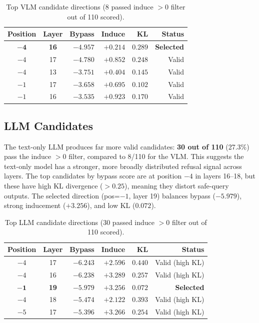 \documentclass[11pt,a4paper]{article}
\begin{document}
\begin{table}[H]\centering
\caption{Top VLM candidate directions (8 passed induce $> 0$ filter out of 110 scored).}
\begin{tabular}{ccrrrr}
\toprule
\textbf{Position} & \textbf{Layer} & \textbf{Bypass} & \textbf{Induce} & \textbf{KL} & \textbf{Status} \\
\midrule
$\mathbf{-4}$ & \textbf{16} & $\mathbf{-4.957}$ & $\mathbf{+0.214}$ & $\mathbf{0.289}$ & \textbf{Selected} \\
$-4$ & 17 & $-4.780$ & $+0.852$ & $0.248$ & Valid \\
$-4$ & 13 & $-3.751$ & $+0.404$ & $0.145$ & Valid \\
$-1$ & 17 & $-3.658$ & $+0.695$ & $0.102$ & Valid \\
$-1$ & 16 & $-3.535$ & $+0.923$ & $0.170$ & Valid \\
\bottomrule
\end{tabular}
\end{table}

\subsection{LLM Candidates}

The text-only LLM produces far more valid candidates: \textbf{30 out of 110} (27.3\%) pass the induce $> 0$ filter, compared to 8/110 for the VLM. This suggests the text-only model has a stronger, more broadly distributed refusal signal across layers. The top candidates by bypass score are at position $-4$ in layers 16--18, but these have high KL divergence ($> 0.25$), meaning they distort safe-query outputs. The selected direction (pos=$-1$, layer 19) balances bypass ($-5.979$), strong inducement ($+3.256$), and low KL ($0.072$).

\begin{table}[H]\centering
\caption{Top LLM candidate directions (30 passed induce $> 0$ filter out of 110 scored).}
\begin{tabular}{ccrrrr}
\toprule
\textbf{Position} & \textbf{Layer} & \textbf{Bypass} & \textbf{Induce} & \textbf{KL} & \textbf{Status} \\
\midrule
$-4$ & 17 & $-6.243$ & $+2.596$ & $0.440$ & Valid (high KL) \\
$-4$ & 16 & $-6.238$ & $+3.289$ & $0.257$ & Valid (high KL) \\
$\mathbf{-1}$ & \textbf{19} & $\mathbf{-5.979}$ & $\mathbf{+3.256}$ & $\mathbf{0.072}$ & \textbf{Selected} \\
$-4$ & 18 & $-5.474$ & $+2.122$ & $0.393$ & Valid (high KL) \\
$-5$ & 17 & $-5.396$ & $+3.266$ & $0.254$ & Valid (high KL) \\
\bottomrule
\end{tabular}
\end{table}
\end{document}
